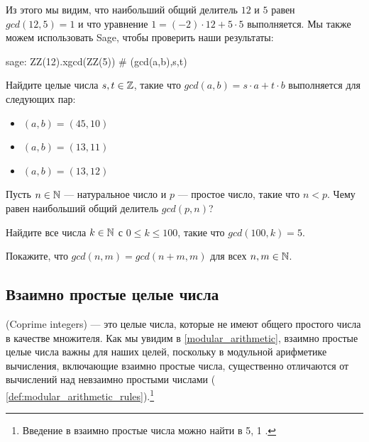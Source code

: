 \begin{example}

Из этого мы видим, что наибольший общий делитель $12$ и $5$ равен $ gcd (12, 5) = 1 $ и что уравнение $ 1 = (-2) \cdot 12 + 5 \cdot 5 $ выполняется. Мы также можем использовать Sage, чтобы проверить наши результаты:
\begin{sagecommandline}
sage: ZZ(12).xgcd(ZZ(5)) # (gcd(a,b),s,t)
\end{sagecommandline}
\end{example}
\begin{exercise}
\label{exercise:extended_Euclidean_division_1}
Найдите целые числа $s,t\in\mathbb{Z}$, такие что $gcd(a,b)= s\cdot a +t\cdot b$ выполняется для следующих пар:
\begin{itemize}\compactlist{}
\item $(a,b) = (45,10)$
\item $(a,b)=(13,11)$
\item $(a,b)=(13,12)$
\end{itemize}
\end{exercise}
\begin{exercise}
\label{exercise_towards_counting_numbers}
Пусть $n\in \mathbb{N}$ — натуральное число и $p$ — простое число, такие что $n<p$. Чему равен наибольший общий делитель $gcd(p,n)$?
\end{exercise}
\begin{exercise}
Найдите все числа $k\in\mathbb{N}$ с $0\leq k \leq 100$, такие что $gcd(100,k) = 5$.
\end{exercise}
\begin{exercise}
Покажите, что $gcd(n,m) = gcd(n+m,m)$ для всех $n,m\in\mathbb{N}$.
\end{exercise}
\subsection{Взаимно простые целые числа}
\label{def:coprime_integers}
 (Coprime integers) — это целые числа, которые не имеют общего простого числа в качестве множителя. Как мы увидим в \secname{} \ref{modular_arithmetic}, взаимно простые целые числа важны для наших целей, поскольку в модульной арифметике вычисления, включающие взаимно простые числа, существенно отличаются от вычислений над невзаимно простыми числами ( \ref{def:modular_arithmetic_rules}).\footnote{Введение в взаимно простые числа можно найти в \chaptname{} 5, \secname{} 1 \cite{hardy-2008}.}

